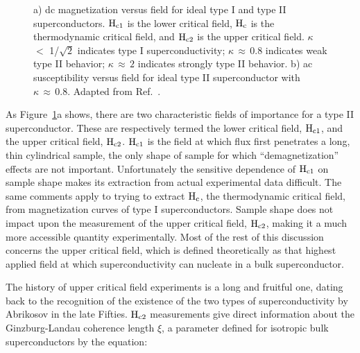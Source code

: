 \begin{figure}
\vspace{14cm}
\caption[Comparison of type I and type II superconductors.]{a) dc magnetization
versus field for ideal type I and type II superconductors.  $\rm H_{c1}$ is
the lower critical field, $\rm  H_c$ is the  thermodynamic critical  field,
and $\rm H_{c2}$  is the upper  critical field.  $\kappa$  $<$ 1/$\sqrt{2}$
indicates type I  superconductivity; $\kappa \, \approx \,  0.8$  indicates
weak type II behavior; $\kappa \, \approx \, 2$  indicates strongly type II
behavior.   b)   ac   susceptibility   versus  field  for   ideal  type  II
superconductor with $\kappa \,
\approx \, 0.8$.    Adapted  from
Ref.~\cite{tinkham80}.}
\label{fig:meiss}
\end{figure}


	As    Figure~\ref{fig:meiss}a  shows, there  are two characteristic
fields of importance for a type  II superconductor.  These are respectively
termed   the lower critical  field,  $\rm   H_{c1}$, and the upper critical
field,  $\rm H_{c2}$.  $\rm  H_{c1}$ is  the field    at  which flux  first
penetrates a long, thin cylindrical  sample, the only  shape of sample  for
which ``demagnetization''  effects  are  not important.  Unfortunately  the
sensitive dependence of $\rm  H_{c1}$ on sample  shape makes its extraction
from actual experimental data difficult.  The same comments apply to trying
to extract $\rm H_c$, the thermodynamic critical  field, from magnetization
curves  of type I superconductors.   Sample shape does not impact  upon the
measurement of  the upper critical field,  $\rm  H_{c2}$,  making it a much
more  accessible quantity  experimentally.   Most  of the  rest    of  this
discussion  concerns   the    upper  critical    field,  which is   defined
theoretically as that highest  applied field at which superconductivity can
nucleate in a bulk superconductor.

	The history of   upper critical field  experiments   is a long  and
fruitful one, dating  back to the recognition  of the existence  of the two
types     of    superconductivity     by   Abrikosov    in     the     late
Fifties\cite{abrikosov57}.  $\rm     H_{c2}$ measurements  give      direct
information about the Ginzburg-Landau coherence length $\xi$,  a parameter
defined for isotropic bulk superconductors by the equation:

